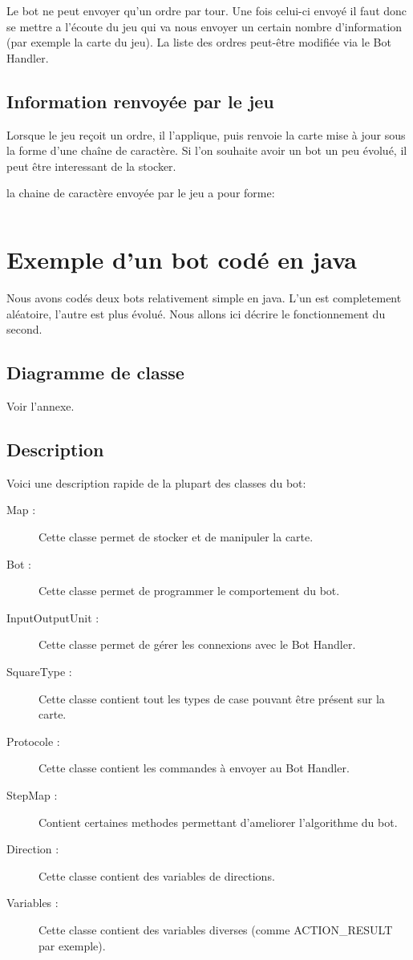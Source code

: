 Le bot ne peut envoyer qu'un ordre par tour. Une fois celui-ci envoyé il faut donc se mettre a l'écoute du jeu qui va nous envoyer un certain nombre d'information (par exemple la carte du jeu). La liste des ordres peut-être modifiée via le Bot Handler.

\subsection{Information renvoyée par le jeu}
Lorsque le jeu reçoit un ordre, il l'applique, puis renvoie la carte mise à jour sous la forme d'une chaîne de caractère. Si l'on souhaite avoir un bot un peu évolué, il peut être interessant de la stocker. 

la chaine de caractère envoyée par le jeu a pour forme:
\begin{verbatim}

\end{verbatim}

\section{Exemple d'un bot codé en java}

Nous avons codés deux bots relativement simple en java. L'un est completement aléatoire, l'autre est plus évolué. Nous allons ici décrire le fonctionnement du second.

\subsection{Diagramme de classe}

Voir l'annexe.
 
\subsection{Description}

Voici une description rapide de la plupart des classes du bot:

\begin{description}
\item[Map :] Cette classe permet de stocker et de manipuler la carte.
\item[Bot :] Cette classe permet de programmer le comportement du bot.
\item[InputOutputUnit :] Cette classe permet de gérer les connexions avec le Bot Handler.
\item[SquareType :] Cette classe contient tout les types de case pouvant être présent sur la carte.
\item[Protocole :] Cette classe contient les commandes à envoyer au Bot Handler.
\item[StepMap :] Contient certaines methodes permettant d'ameliorer l'algorithme du bot.
\item[Direction :] Cette classe contient des variables de directions.
\item[Variables :] Cette classe contient des variables diverses (comme ACTION\_RESULT par exemple).
\end{description} 

